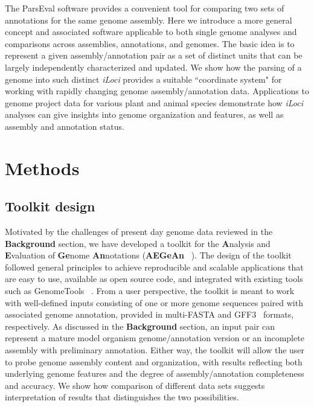 The ParsEval software \cite{StandageBrendel2012} provides a convenient tool for comparing two sets of annotations for the same genome assembly.
Here we introduce a more general concept and associated software applicable to both single genome analyses and comparisons across assemblies, annotations, and genomes.
The basic idea is to represent a given assembly/annotation pair as a set of distinct units that can be largely independently characterized and updated.
We show how the parsing of a genome into such distinct \textit{iLoci} provides a suitable ``coordinate system" for working with rapidly changing genome assembly/annotation data.
Applications to genome project data for various plant and animal species demonstrate how \textit{iLoci} analyses can give insights into genome organization and features, as well as assembly and annotation status.

\section*{Methods}

\subsection*{Toolkit design}
Motivated by the challenges of present day genome data reviewed in the \textbf{Background} section, we have developed a toolkit for the \textbf{A}nalysis and \textbf{E}valuation of \textbf{Ge}nome \textbf{An}notations (\textbf{AEGeAn}~ \cite{AEGeAn}).
The design of the toolkit followed general principles to achieve reproducible and scalable applications that are easy to use, available as open source code, and integrated with existing tools such as GenomeTools~ \cite{GenomeTools, GenomeToolsWebsite}.
From a user perspective, the toolkit is meant to work with well-defined inputs consisting of one or more genome sequences paired with associated genome annotation, provided in multi-FASTA and GFF3~ \cite{GFF3} formats, respectively.
As discussed in the \textbf{Background} section, an input pair can represent a mature model organism genome/annotation version or an incomplete assembly with preliminary annotation.
Either way, the toolkit will allow the user to probe genome assembly content and organization, with results reflecting both underlying genome features and the degree of assembly/annotation completeness and accuracy.
We show how comparison of different data sets suggests interpretation of results that distinguishes the two possibilities.

